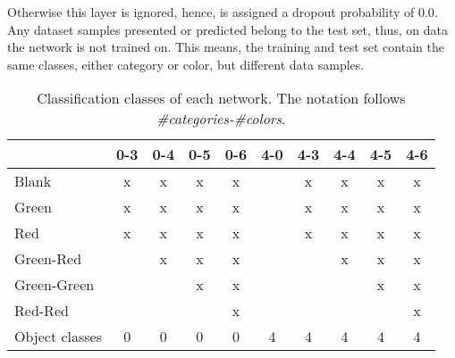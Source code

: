 Otherwise this layer is ignored, hence, is assigned a dropout probability of $0.0$.
Any dataset samples presented or predicted belong to the test set, thus, on data the network is not trained on.
This means, the training and test set contain the same classes, either category or color, but different data samples.
\begin{table}[]
\centering
\caption[Classification classes of each network]{Classification classes of each network. The notation follows \emph{\#categories-\#colors}.}
\label{tab:network-classes}
\begin{tabular}{l|ccccccccc}
               & \multicolumn{1}{l}{0-3} & \multicolumn{1}{l}{0-4} & \multicolumn{1}{l}{0-5} & \multicolumn{1}{l}{0-6} & \multicolumn{1}{l}{4-0} & \multicolumn{1}{l}{4-3} & \multicolumn{1}{l}{4-4} & \multicolumn{1}{l}{4-5} & \multicolumn{1}{l}{4-6} \\ \hline
Blank          & x                       & x                       & x                       & x                       &                         & x                       & x                       & x                       & x                       \\
Green          & x                       & x                       & x                       & x                       &                         & x                       & x                       & x                       & x                       \\
Red            & x                       & x                       & x                       & x                       &                         & x                       & x                       & x                       & x                       \\
Green-Red      &                         & x                       & x                       & x                       &                         &                         & x                       & x                       & x                       \\
Green-Green    &                         &                         & x                       & x                       &                         &                         &                         & x                       & x                       \\
Red-Red        &                         &                         &                         & x                       &                         &                         &                         &                         & x                       \\ \hline
Object classes & 0                       & 0                       & 0                       & 0                       & 4                       & 4                       & 4                       & 4                       & 4                      
\end{tabular}
\end{table}



